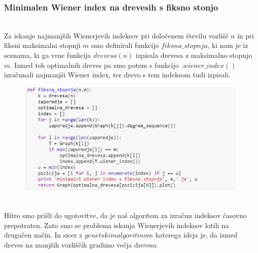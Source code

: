 \documentclass[12pt,a4paper]{amsart}
\theoremstyle{definition} %
\theoremstyle{plain} %
\begin{document}
\subsubsection{Minimalen Wiener index na drevesih s fiksno stonjo}
\
\\
Za iskanje najmanjših Wienerjevih indeksov pri določenem številu vozlišč $n$ in pri fiksni maksimalni stopnji  $m$
smo definirali funkcijo $fiksna\_stopnja$,  ki nam je iz seznama, ki ga vrne funkcija $drevesa(n)$ izpisala drevesa z maksimalno stopnjo $m$. Izmed teh optimalnih dreves pa smo potem s funkcijo $.wiener\_index()$ izračunali najmanjši Wiener index, ter drevo s tem indeksom tudi izpisali.

\begin{figure}[ht]
\centering
\includegraphics[width=1\textwidth]{slika2}
\end{figure}
\pagebreak
\
\\
Hitro smo prišli do ugotovitve, da je naš algoritem za izračun indeksov časovno prepotraten. Zato smo se problema iskanja Wienerjevih indeksov lotili na drugačen način. In sicer z $genetskim algoritmom$ katerega ideja je, da izmed dreves na manjših vozliščih gradimo večja drevesa
\end{document}
